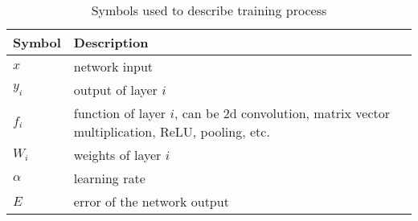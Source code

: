 \begin{table}[htbp]
    \centering
    \caption{Symbols used to describe training process}
      \begin{tabular}{lp{}} \toprule
      Symbol   & Description \\ \hline
      $x$      & network input \\
      $y_i$    & output of layer $i$ \\
      $f_i$    & function of layer $i$, can be 2d convolution, matrix vector multiplication, ReLU, pooling, etc. \\
      $W_i$    & weights of layer $i$ \\
      $\alpha$ & learning rate \\
      $E$      & error of the network output \\ \bottomrule
      \end{tabular}%
    \label{tab:symbol}%
  \end{table}%